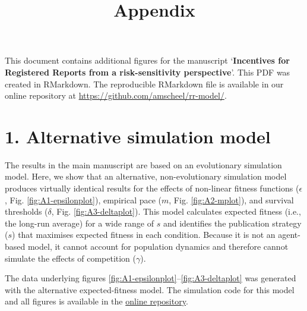 \documentclass[
]{article}
\title{Appendix}
\author{}
\date{\vspace{-2.5em}}
\begin{document}
\maketitle

\raggedright
\setcounter{table}{0}\setcounter{figure}{0}

This document contains additional figures for the manuscript `\textbf{Incentives for Registered Reports from a risk-sensitivity perspective}'. This PDF was created in RMarkdown. The reproducible RMarkdown file is available in our online repository at \url{https://github.com/amscheel/rr-model/}.

\hypertarget{alternative-simulation-model}{%
\section{1. Alternative simulation model}\label{alternative-simulation-model}}

The results in the main manuscript are based on an evolutionary simulation model.
Here, we show that an alternative, non-evolutionary simulation model produces virtually identical results for the effects of non-linear fitness functions (\(\epsilon\), Fig. \ref{fig:A1-epsilonplot}), empirical pace (\(m\), Fig. \ref{fig:A2-mplot}), and survival thresholds (\(\delta\), Fig. \ref{fig:A3-deltaplot}).
This model calculates expected fitness (i.e., the long-run average) for a wide range of \(s\) and identifies the publication strategy (\(s\)) that maximises expected fitness in each condition.
Because it is not an agent-based model, it cannot account for population dynamics and therefore cannot simulate the effects of competition (\(\gamma\)).

The data underlying figures \ref{fig:A1-epsilonplot}--\ref{fig:A3-deltaplot} was generated with the alternative expected-fitness model.
The simulation code for this model and all figures is available in the \href{https://github.com/amscheel/rr-model/}{online repository}.
\end{document}
